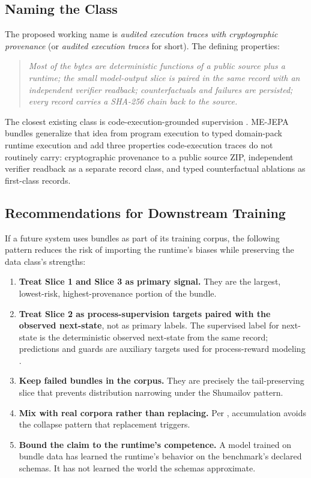 \documentclass[10pt,twocolumn,letterpaper]{article}
\begin{document}
\subsection{Naming the Class}

The proposed working name is \emph{audited execution traces with
cryptographic provenance} (or \emph{audited execution traces} for
short). The defining properties:
\begin{quote}\itshape
Most of the bytes are deterministic functions of a public source
plus a runtime; the small model-output slice is paired in the same
record with an independent verifier readback; counterfactuals and
failures are persisted; every record carries a SHA-256 chain back
to the source.
\end{quote}
The closest existing class is code-execution-grounded supervision
\cite{jung2025codeexec}. ME-JEPA bundles generalize that idea from
program execution to typed domain-pack runtime execution and add
three properties code-execution traces do not routinely carry:
cryptographic provenance to a public source ZIP, independent
verifier readback as a separate record class, and typed
counterfactual ablations as first-class records.

\subsection{Recommendations for Downstream Training}

If a future system uses bundles as part of its training corpus, the
following pattern reduces the risk of importing the runtime's
biases while preserving the data class's strengths:

\begin{enumerate}[leftmargin=1.2em]
\item \textbf{Treat Slice 1 and Slice 3 as primary signal.} They
      are the largest, lowest-risk, highest-provenance portion of
      the bundle.
\item \textbf{Treat Slice 2 as process-supervision targets paired
      with the observed next-state}, not as primary labels. The
      supervised label for next-state is the deterministic observed
      next-state from the same record; predictions and guards are
      auxiliary targets used for process-reward modeling
      \cite{lightman2023verify}.
\item \textbf{Keep failed bundles in the corpus.} They are
      precisely the tail-preserving slice that prevents
      distribution narrowing under the Shumailov pattern.
\item \textbf{Mix with real corpora rather than replacing.} Per
      \cite{gerstgrasser2024accumulate}, accumulation avoids the
      collapse pattern that replacement triggers.
\item \textbf{Bound the claim to the runtime's competence.} A model
      trained on bundle data has learned the runtime's behavior on
      the benchmark's declared schemas. It has not learned the
      world the schemas approximate.
\end{enumerate}
\end{document}
